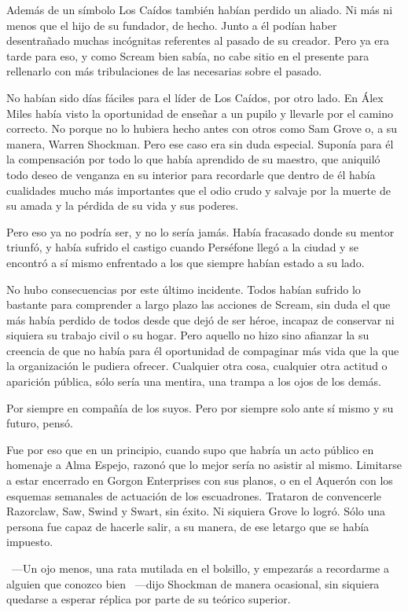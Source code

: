 Además de un símbolo Los Caídos también habían perdido un aliado. Ni más ni menos que el hijo de su fundador, de hecho. Junto a él podían haber desentrañado muchas incógnitas referentes al pasado de su creador. Pero ya era tarde para eso, y como Scream bien sabía, no cabe sitio en el presente para rellenarlo con más tribulaciones de las necesarias sobre el pasado.

No habían sido días fáciles para el líder de Los Caídos, por otro lado. En Álex Miles había visto la oportunidad de enseñar a un pupilo y llevarle por el camino correcto. No porque no lo hubiera hecho antes con otros como Sam Grove o, a su manera, Warren Shockman. Pero ese caso era sin duda especial. Suponía para él la compensación por todo lo que había aprendido de su maestro, que aniquiló todo deseo de venganza en su interior para recordarle que dentro de él había cualidades mucho más importantes que el odio crudo y salvaje por la muerte de su amada y la pérdida de su vida y sus poderes.

Pero eso ya no podría ser, y no lo sería jamás. Había fracasado donde su mentor triunfó, y había sufrido el castigo cuando Perséfone llegó a la ciudad y se encontró a sí mismo enfrentado a los que siempre habían estado a su lado.

No hubo consecuencias por este último incidente. Todos habían sufrido lo bastante para comprender a largo plazo las acciones de Scream, sin duda el que más había perdido de todos desde que dejó de ser héroe, incapaz de conservar ni siquiera su trabajo civil o su hogar. Pero aquello no hizo sino afianzar la su creencia de que no había para él oportunidad de compaginar más vida que la que la organización le pudiera ofrecer. Cualquier otra cosa, cualquier otra actitud o aparición pública, sólo sería una mentira, una trampa a los ojos de los demás.

Por siempre en compañía de los suyos. Pero por siempre solo ante sí mismo y su futuro, pensó.

Fue por eso que en un principio, cuando supo que habría un acto público en homenaje a Alma Espejo, razonó que lo mejor sería no asistir al mismo. Limitarse a estar encerrado en Gorgon Enterprises con sus planos, o en el Aquerón con los esquemas semanales de actuación de los escuadrones. Trataron de convencerle Razorclaw, Saw, Swind y Swart, sin éxito. Ni siquiera Grove lo logró. Sólo una persona fue capaz de hacerle salir, a su manera, de ese letargo que se había impuesto.

~---Un ojo menos, una rata mutilada en el bolsillo, y empezarás a recordarme a alguien que conozco bien ~---dijo Shockman de manera ocasional, sin siquiera quedarse a esperar réplica por parte de su teórico superior.

